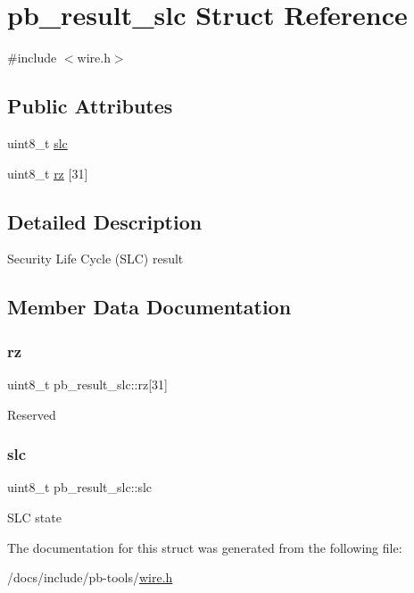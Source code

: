 \hypertarget{structpb__result__slc}{}\section{pb\+\_\+result\+\_\+slc Struct Reference}
\label{structpb__result__slc}


{\ttfamily \#include $<$wire.\+h$>$}

\subsection*{Public Attributes}
\begin{DoxyCompactItemize}
\item 
uint8\+\_\+t \hyperlink{structpb__result__slc_ab784c0c613afb99d978f8d560ec72fe3}{slc}
\item 
uint8\+\_\+t \hyperlink{structpb__result__slc_a81d33e682a6b72de829c0751b3278ee0}{rz} \mbox{[}31\mbox{]}
\end{DoxyCompactItemize}


\subsection{Detailed Description}
Security Life Cycle (S\+LC) result 

\subsection{Member Data Documentation}
\mbox{\label{structpb__result__slc_a81d33e682a6b72de829c0751b3278ee0}} 
\subsubsection{\texorpdfstring{rz}{rz}}
{\footnotesize\ttfamily uint8\+\_\+t pb\+\_\+result\+\_\+slc\+::rz\mbox{[}31\mbox{]}}

Reserved \mbox{\label{structpb__result__slc_ab784c0c613afb99d978f8d560ec72fe3}} 
\subsubsection{\texorpdfstring{slc}{slc}}
{\footnotesize\ttfamily uint8\+\_\+t pb\+\_\+result\+\_\+slc\+::slc}

S\+LC state 

The documentation for this struct was generated from the following file\+:\begin{DoxyCompactItemize}
\item 
/docs/include/pb-\/tools/\hyperlink{wire_8h}{wire.\+h}\end{DoxyCompactItemize}

